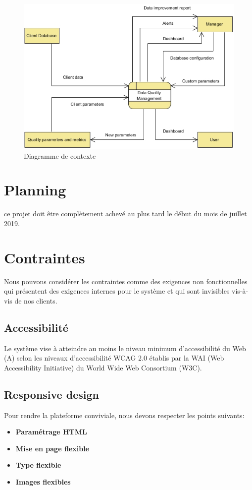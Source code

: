 \documentclass[oneside]{book}
\begin{document}
\begin{figure}[h!]
  \caption{Diagramme de contexte}
  \includegraphics[width=\textwidth]{img/Context_DFD.jpg}
\end{figure}


\section{Planning}

ce projet doit être complètement achevé au plus tard le début du mois de juillet 2019.

\section{Contraintes}
Nous pouvons considérer les contraintes comme des exigences non fonctionnelles qui présentent des exigences internes pour le système et qui sont invisibles vis-à-vis de nos clients.
\subsection{Accessibilité}
Le système vise à atteindre au moins le niveau minimum d'accessibilité du Web (A) selon les niveaux d'accessibilité WCAG 2.0 établis par la WAI (Web Accessibility Initiative) du World Wide Web Consortium (W3C).
\subsection{Responsive design}
Pour rendre la plateforme conviviale, nous devons respecter les points suivants:
\begin{itemize}
    \item \textbf{Paramétrage HTML}
    \item \textbf{Mise en page flexible}
    \item \textbf{Type flexible}
    \item \textbf{Images flexibles}
\end{itemize}
\end{document}
